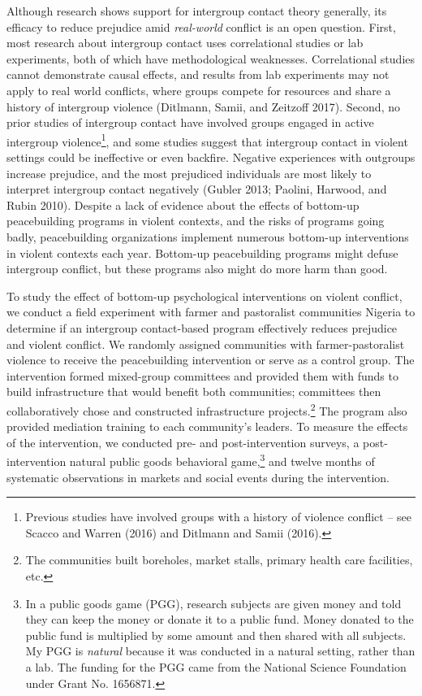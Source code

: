 \documentclass[11pt]{article}
\begin{document}
Although research shows support for intergroup contact theory generally,
its efficacy to reduce prejudice amid \emph{real-world} conflict is an
open question. First, most research about intergroup contact uses
correlational studies or lab experiments, both of which have
methodological weaknesses. Correlational studies cannot demonstrate
causal effects, and results from lab experiments may not apply to real
world conflicts, where groups compete for resources and share a history
of intergroup violence (Ditlmann, Samii, and Zeitzoff 2017). Second, no
prior studies of intergroup contact have involved groups engaged in
active intergroup violence\footnote{Previous studies have involved
  groups with a history of violence conflict -- see Scacco and Warren
  (2016) and Ditlmann and Samii (2016).}, and some studies suggest that
intergroup contact in violent settings could be ineffective or even
backfire. Negative experiences with outgroups increase prejudice, and
the most prejudiced individuals are most likely to interpret intergroup
contact negatively (Gubler 2013; Paolini, Harwood, and Rubin 2010).
Despite a lack of evidence about the effects of bottom-up peacebuilding
programs in violent contexts, and the risks of programs going badly,
peacebuilding organizations implement numerous bottom-up interventions
in violent contexts each year. Bottom-up peacebuilding programs might
defuse intergroup conflict, but these programs also might do more harm
than good.

To study the effect of bottom-up psychological interventions on violent
conflict, we conduct a field experiment with farmer and pastoralist
communities Nigeria to determine if an intergroup contact-based program
effectively reduces prejudice and violent conflict. We randomly assigned
communities with farmer-pastoralist violence to receive the
peacebuilding intervention or serve as a control group. The intervention
formed mixed-group committees and provided them with funds to build
infrastructure that would benefit both communities; committees then
collaboratively chose and constructed infrastructure projects.\footnote{The
  communities built boreholes, market stalls, primary health care
  facilities, etc.} The program also provided mediation training to each
community's leaders. To measure the effects of the intervention, we
conducted pre- and post-intervention surveys, a post-intervention
natural public goods behavioral game,\footnote{In a public goods game
  (PGG), research subjects are given money and told they can keep the
  money or donate it to a public fund. Money donated to the public fund
  is multiplied by some amount and then shared with all subjects. My PGG
  is \emph{natural} because it was conducted in a natural setting,
  rather than a lab. The funding for the PGG came from the National
  Science Foundation under Grant No. 1656871.} and twelve months of
systematic observations in markets and social events during the
intervention.
\end{document}
